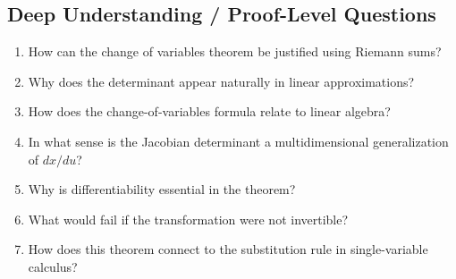 \subsection{Deep Understanding / Proof-Level Questions}

\begin{enumerate}

\item How can the change of variables theorem be justified using Riemann sums?

\item Why does the determinant appear naturally in linear approximations?

\item How does the change-of-variables formula relate to linear algebra?

\item In what sense is the Jacobian determinant a multidimensional generalization of $dx/du$?

\item Why is differentiability essential in the theorem?

\item What would fail if the transformation were not invertible?

\item How does this theorem connect to the substitution rule in single-variable calculus?

\end{enumerate}

